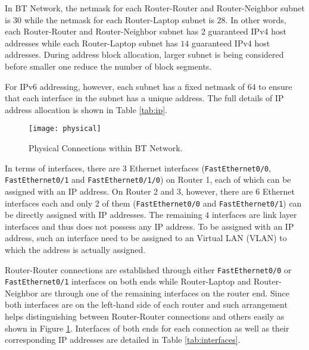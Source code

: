 In BT Network, the netmask for each Router-Router and Router-Neighbor subnet is $30$ while the netmask for each Router-Laptop subnet is $28$. In other words, each Router-Router and Router-Neighbor subnet has $2$ guaranteed IPv4 host addresses while each Router-Laptop subnet has $14$ guaranteed IPv4 host addresses. During address block allocation, larger subnet is being considered before smaller one reduce the number of block segments.

For IPv6 addressing, however, each subnet has a fixed netmask of $64$ to ensure that each interface in the subnet has a unique address. The full details of IP address allocation is shown in Table \ref{tab:ip}.

\begin{figure}[ht!]
    \centering
    \texttt{[image: physical]}
    \caption{Physical Connections within BT Network.}
    \label{fig:physical}
\end{figure}

In terms of interfaces, there are $3$ Ethernet interfaces (\texttt{FastEthernet0/0}, \texttt{FastEthernet0/1} and \texttt{FastEthernet0/1/0}) on Router 1, each of which can be assigned with an IP address. On Router 2 and 3, however, there are $6$ Ethernet interfaces each and only $2$ of them (\texttt{FastEthernet0/0} and \texttt{FastEthernet0/1}) can be directly assigned with IP addresses. 
The remaining $4$ interfaces are link layer interfaces and thus does not possess any IP address.
To be assigned with an IP address, such an interface need to be assigned to an Virtual LAN (VLAN) to which the address is actually assigned.

Router-Router connections are established through either \texttt{FastEthernet0/0} or \texttt{FastEthernet0/1} interfaces on both ends while Router-Laptop and Router-Neighbor are through one of the remaining interfaces on the router end.
Since both interfaces are on the left-hand side of each router and such arrangement helps distinguishing between Router-Router connections and others easily as shown in Figure \ref{fig:physical}. Interfaces of both ends for each connection as well as their corresponding IP addresses are detailed in Table \ref{tab:interfaces}.

